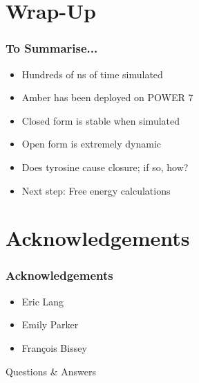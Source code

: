 \documentclass{beamer}
\begin{document}
\section{Wrap-Up}
\begin{frame}
	\frametitle{To Summarise...}
	\begin{itemize}
		\item Hundreds of ns of time simulated
		\item Amber has been deployed on POWER 7
		\item Closed form is stable when simulated
		\item Open form is extremely dynamic
		\item Does tyrosine cause closure; if so, how?
		\item Next step: Free energy calculations
	\end{itemize}
\end{frame}

\section{Acknowledgements}
\begin{frame}
  \frametitle{Acknowledgements}
   \begin{itemize}
	\item Eric Lang
	\item Emily Parker
	\item Fran\c{c}ois Bissey
	\end{itemize}
\end{frame}


{
  \begin{frame}[plain]
    \begin{center}
    {\Huge Questions \& Answers}
    \end{center}
  \end{frame}
}
\end{document}
